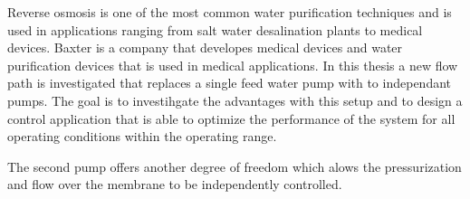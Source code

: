 Reverse osmosis is one of the most common water purification techniques and is used in applications ranging from salt water desalination plants to medical devices. Baxter is a company that developes medical devices and water purification devices that is used in medical applications. In this thesis a new flow path is investigated that replaces a single feed water pump with to independant pumps. The goal is to investihgate the advantages with this setup and to design a control application that is able to optimize the performance of the system for all operating conditions within the operating range. 

The second pump offers another degree of freedom which alows the pressurization and flow over the membrane to be independently controlled. 